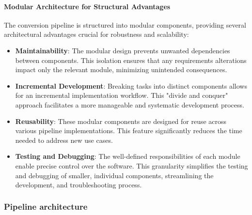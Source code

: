 \paragraph{Modular Architecture for Structural Advantages}
The conversion pipeline is structured into modular components, providing several architectural advantages crucial for robustness and scalability: 

\begin{itemize}
    \item \textbf{Maintainability}: The modular design prevents unwanted dependencies between components. This isolation ensures that any requirements alterations impact only the relevant module, minimizing unintended consequences.
    \item \textbf{Incremental Development}: Breaking tasks into distinct components allows for an incremental implementation workflow. This "divide and conquer" approach facilitates a more manageable and systematic development process. 
    \item \textbf{Reusability}: These modular components are designed for reuse across various pipeline implementations. This feature significantly reduces the time needed to address new use cases.
    \item \textbf{Testing and Debugging}: The well-defined responsibilities of each module enable precise control over the software. This granularity simplifies the testing and debugging of smaller, individual components, streamlining the development, and troubleshooting process. 
\end{itemize}

\subsubsection{Pipeline architecture}

